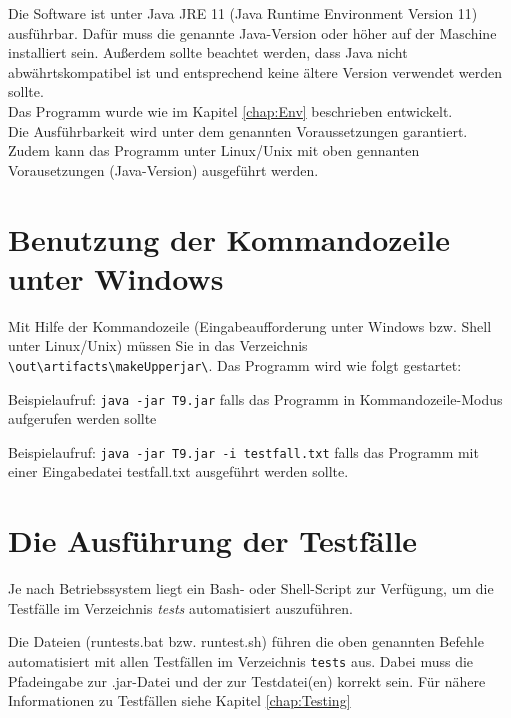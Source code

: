 Die Software ist unter Java JRE 11 (Java Runtime Environment Version 11) ausführbar. Dafür muss die genannte Java-Version oder höher auf der Maschine installiert sein. Außerdem sollte beachtet werden, dass Java nicht abwährtskompatibel ist und entsprechend keine ältere Version verwendet werden sollte.\\
Das Programm wurde wie im Kapitel \ref{chap:Env} beschrieben entwickelt.\\
Die Ausführbarkeit wird unter dem genannten Voraussetzungen garantiert.\\
Zudem kann das Programm unter Linux/Unix mit oben gennanten Vorausetzungen (Java-Version) ausgeführt werden.



\section{Benutzung der Kommandozeile unter Windows}


Mit Hilfe der Kommandozeile (Eingabeaufforderung unter Windows bzw. Shell unter Linux/Unix) müssen Sie in das Verzeichnis \texttt{\texttildelow \textbackslash out\textbackslash artifacts\textbackslash makeUpper\textunderscore jar\textbackslash}. 
Das Programm wird wie folgt gestartet: 

Beispielaufruf: \texttt{java -jar T9.jar} falls das Programm in Kommandozeile-Modus aufgerufen werden sollte

Beispielaufruf: \texttt{java -jar T9.jar -i testfall.txt} falls das Programm mit einer Eingabedatei testfall.txt ausgeführt werden sollte.


\section{Die Ausführung der Testfälle}
Je nach Betriebssystem liegt ein Bash- oder Shell-Script zur Verfügung, um die Testfälle im Verzeichnis \textit{tests} automatisiert auszuführen.


Die Dateien (run\textunderscore tests.bat bzw. run\textunderscore test.sh) führen die oben genannten Befehle automatisiert mit allen Testfällen im Verzeichnis \texttt{tests} aus. Dabei muss die Pfadeingabe zur .jar-Datei und der zur Testdatei(en) korrekt sein. 
Für nähere Informationen zu Testfällen siehe Kapitel  \ref{chap:Testing}
